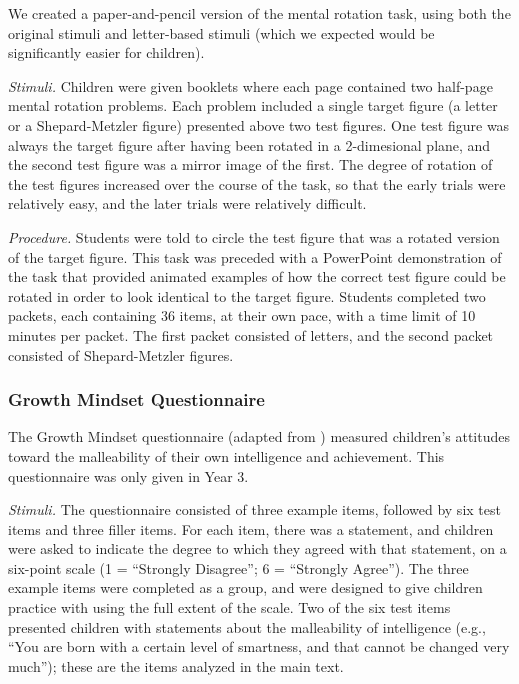 \documentclass[11pt]{article}
\begin{document}
We created a paper-and-pencil version of the  mental rotation task, using both the original stimuli and letter-based stimuli (which we expected would be significantly easier for children).

{\it Stimuli.} Children were given booklets where each page contained two half-page mental rotation problems. Each problem included a single target figure (a letter or a Shepard-Metzler figure) presented above two test figures. One test figure was always the target figure after having been rotated in a 2-dimesional plane, and the second test figure was a mirror image of the first. The degree of rotation of the test figures increased over the course of the task, so that the early trials were relatively easy, and the later trials were relatively difficult.

{\it Procedure.} Students were told to circle the test figure that was a rotated version of the target figure. This task was preceded with a PowerPoint demonstration of the task that provided animated examples of how the correct test figure could be rotated in order to look identical to the target figure. Students completed two packets, each containing 36 items, at their own pace, with a time limit of 10 minutes per packet. The first packet consisted of letters, and the second packet consisted of Shepard-Metzler figures.

\subsubsection{Growth Mindset Questionnaire}

The Growth Mindset questionnaire (adapted from ) measured children's attitudes toward the malleability of their own intelligence and achievement. This questionnaire was only given in Year 3.

{\it Stimuli.} The questionnaire consisted of three example items, followed by six test items and three filler items. For each item, there was a statement, and children were asked to indicate the degree to which they agreed with that statement, on a six-point scale (1 = ``Strongly Disagree''; 6 = ``Strongly Agree''). The three example items were completed as a group, and were designed to give children practice with using the full extent of the scale. Two of the six test items presented children with statements about the malleability of intelligence (e.g., ``You are born with a certain level of smartness, and that cannot be changed very much''); these are the items analyzed in the main text.
\end{document}
